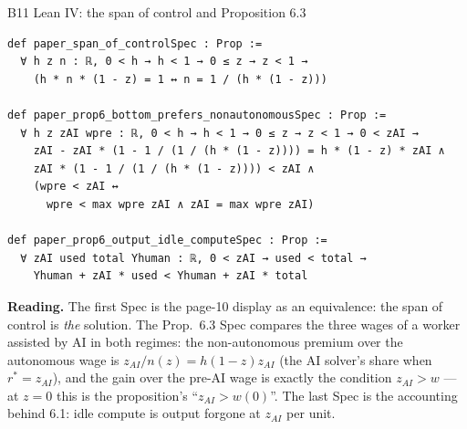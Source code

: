 \documentclass[aspectratio=169,11pt]{beamer}
\begin{document}
\begin{frame}[fragile]{B11 \textperiodcentered{} Lean IV: the span of control and Proposition 6.3}
  \scriptsize
  \begin{lstlisting}[basicstyle=\ttfamily\tiny]
def paper_span_of_controlSpec : Prop :=
  ∀ h z n : ℝ, 0 < h → h < 1 → 0 ≤ z → z < 1 →
    (h * n * (1 - z) = 1 ↔ n = 1 / (h * (1 - z)))

def paper_prop6_bottom_prefers_nonautonomousSpec : Prop :=
  ∀ h z zAI wpre : ℝ, 0 < h → h < 1 → 0 ≤ z → z < 1 → 0 < zAI →
    zAI - zAI * (1 - 1 / (1 / (h * (1 - z)))) = h * (1 - z) * zAI ∧
    zAI * (1 - 1 / (1 / (h * (1 - z)))) < zAI ∧
    (wpre < zAI ↔
      wpre < max wpre zAI ∧ zAI = max wpre zAI)

def paper_prop6_output_idle_computeSpec : Prop :=
  ∀ zAI used total Yhuman : ℝ, 0 < zAI → used < total →
    Yhuman + zAI * used < Yhuman + zAI * total
  \end{lstlisting}
  \textbf{Reading.} The first Spec is the page-10 display as an equivalence: the span of control is \emph{the} solution.
  The Prop.\ 6.3 Spec compares the three wages of a worker assisted by AI in both regimes: the non-autonomous premium
  over the autonomous wage is $z_{AI}/n(z)=h(1-z)z_{AI}$ (the AI solver's share when $r^*=z_{AI}$), and the gain over the
  pre-AI wage is exactly the condition $z_{AI}>w$ --- at $z=0$ this is the proposition's ``$z_{AI}>w(0)$''. The last
  Spec is the accounting behind 6.1: idle compute is output forgone at $z_{AI}$ per unit.
\end{frame}
\end{document}
